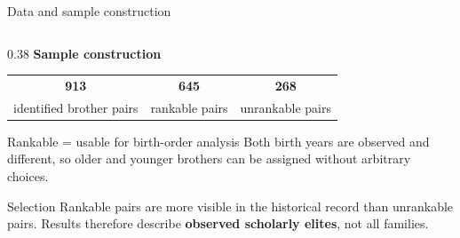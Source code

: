 \documentclass[aspectratio=169,10pt]{beamer}
\begin{document}
\begin{frame}{Data and sample construction}
\begin{columns}[T,onlytextwidth]
\begin{column}{0.38\textwidth}
\textbf{Sample construction}

\vspace{0.10em}

\begin{center}

\begin{tabular}{ccc}
{\large\bfseries\color{FormalNavy}913}
&
{\large\bfseries\color{FormalNavy}645}
&
{\large\bfseries\color{FormalNavy}268}
\\[-0.10em]

{\tiny identified brother pairs}
&
{\tiny rankable pairs}
&
{\tiny unrankable pairs}

\end{tabular}

\end{center}

\vspace{0.15em}

\begin{block}{Rankable = usable for birth-order analysis}
\scriptsize
Both birth years are observed and different, so older and younger
brothers can be assigned without arbitrary choices.
\end{block}

\vspace{-0.25em}

\begin{alertblock}{Selection}
\scriptsize
Rankable pairs are more visible in the historical record than
unrankable pairs. Results therefore describe
\textbf{observed scholarly elites}, not all families.
\end{alertblock}

\end{column}

\end{columns}

\end{frame}
\end{document}
